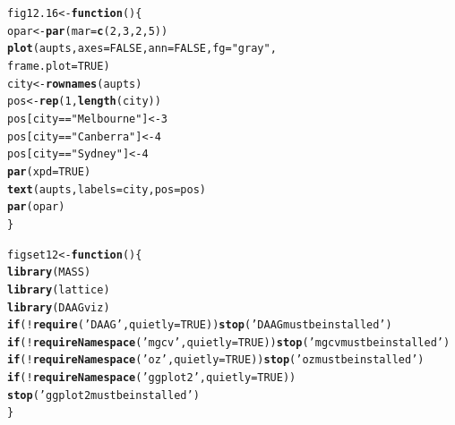 \documentclass[12pt, a4paper,  BCOR=8.25mm, DIV=15]{scrartcl}\usepackage[]{graphicx}\usepackage[]{color}
\makeatletter
\newcommand{\hlnum}[1]{\textcolor[rgb]{0.686,0.059,0.569}{#1}}%
\newcommand{\hlstr}[1]{\textcolor[rgb]{0.192,0.494,0.8}{#1}}%
\newcommand{\hlopt}[1]{\textcolor[rgb]{0,0,0}{#1}}%
\newcommand{\hlstd}[1]{\textcolor[rgb]{0.345,0.345,0.345}{#1}}%
\newcommand{\hlkwa}[1]{\textcolor[rgb]{0.161,0.373,0.58}{\textbf{#1}}}%
\newcommand{\hlkwb}[1]{\textcolor[rgb]{0.69,0.353,0.396}{#1}}%
\newcommand{\hlkwc}[1]{\textcolor[rgb]{0.333,0.667,0.333}{#1}}%
\newcommand{\hlkwd}[1]{\textcolor[rgb]{0.737,0.353,0.396}{\textbf{#1}}}%
\newenvironment{kframe}{%
 \def\at@end@of@kframe{}%
 \ifinner\ifhmode%
  \def\at@end@of@kframe{\end{minipage}}%
  \begin{minipage}{\columnwidth}%
 \fi\fi%
 \def\FrameCommand##1{\hskip\@totalleftmargin \hskip-\fboxsep
 \colorbox{shadecolor}{##1}\hskip-\fboxsep
     \hskip-\linewidth \hskip-\@totalleftmargin \hskip\columnwidth}%
 \MakeFramed {\advance\hsize-\width
   \@totalleftmargin\z@ \linewidth\hsize
   \@setminipage}}%
 {\par\unskip\endMakeFramed%
 \at@end@of@kframe}
\newenvironment{knitrout}{}{} %
\makeatother
\begin{document}
\begin{knitrout}
\color{fgcolor}\begin{kframe}
\begin{alltt}
\hlstd{fig12.16} \hlkwb{<-} \hlkwa{function}\hlstd{()\{}
\hlstd{opar} \hlkwb{<-} \hlkwd{par}\hlstd{(}\hlkwc{mar}\hlstd{=}\hlkwd{c}\hlstd{(}\hlnum{2}\hlstd{,}\hlnum{3}\hlstd{,}\hlnum{2}\hlstd{,}\hlnum{5}\hlstd{))}
\hlkwd{plot}\hlstd{(aupts,} \hlkwc{axes}\hlstd{=}\hlnum{FALSE}\hlstd{,} \hlkwc{ann}\hlstd{=}\hlnum{FALSE}\hlstd{,} \hlkwc{fg}\hlstd{=}\hlstr{"gray"}\hlstd{,}
     \hlkwc{frame.plot}\hlstd{=}\hlnum{TRUE}\hlstd{)}
\hlstd{city} \hlkwb{<-} \hlkwd{rownames}\hlstd{(aupts)}
\hlstd{pos} \hlkwb{<-} \hlkwd{rep}\hlstd{(}\hlnum{1}\hlstd{,}\hlkwd{length}\hlstd{(city))}
\hlstd{pos[city}\hlopt{==}\hlstr{"Melbourne"}\hlstd{]}\hlkwb{<-} \hlnum{3}
\hlstd{pos[city}\hlopt{==}\hlstr{"Canberra"}\hlstd{]} \hlkwb{<-} \hlnum{4}
\hlstd{pos[city}\hlopt{==}\hlstr{"Sydney"}\hlstd{]} \hlkwb{<-} \hlnum{4}
\hlkwd{par}\hlstd{(}\hlkwc{xpd}\hlstd{=}\hlnum{TRUE}\hlstd{)}
\hlkwd{text}\hlstd{(aupts,} \hlkwc{labels}\hlstd{=city,} \hlkwc{pos}\hlstd{=pos)}
\hlkwd{par}\hlstd{(opar)}
\hlstd{\}}
\end{alltt}
\end{kframe}
\end{knitrout}



\newpage

\begin{knitrout}
\color{fgcolor}\begin{kframe}
\begin{alltt}
\hlstd{figset12} \hlkwb{<-} \hlkwa{function}\hlstd{()\{}
    \hlkwd{library}\hlstd{(MASS)}
    \hlkwd{library}\hlstd{(lattice)}
    \hlkwd{library}\hlstd{(DAAGviz)}
    \hlkwa{if}\hlstd{(}\hlopt{!}\hlkwd{require}\hlstd{(}\hlstr{'DAAG'}\hlstd{,} \hlkwc{quietly}\hlstd{=}\hlnum{TRUE}\hlstd{))}\hlkwd{stop}\hlstd{(}\hlstr{'DAAG must be installed'}\hlstd{)}
    \hlkwa{if}\hlstd{(}\hlopt{!}\hlkwd{requireNamespace}\hlstd{(}\hlstr{'mgcv'}\hlstd{,} \hlkwc{quietly}\hlstd{=}\hlnum{TRUE}\hlstd{))}\hlkwd{stop}\hlstd{(}\hlstr{'mgcv must be installed'}\hlstd{)}
    \hlkwa{if}\hlstd{(}\hlopt{!}\hlkwd{requireNamespace}\hlstd{(}\hlstr{'oz'}\hlstd{,} \hlkwc{quietly}\hlstd{=}\hlnum{TRUE}\hlstd{))}\hlkwd{stop}\hlstd{(}\hlstr{'oz must be installed'}\hlstd{)}
  \hlkwa{if}\hlstd{(}\hlopt{!}\hlkwd{requireNamespace}\hlstd{(}\hlstr{'ggplot2'}\hlstd{,} \hlkwc{quietly}\hlstd{=}\hlnum{TRUE}\hlstd{))}
    \hlkwd{stop}\hlstd{(}\hlstr{'ggplot2 must be installed'}\hlstd{)}
\hlstd{\}}
\end{alltt}
\end{kframe}
\end{knitrout}
\end{document}
